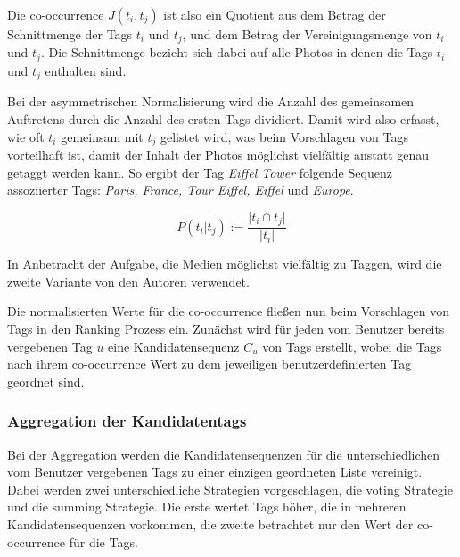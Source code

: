 Die co-occurrence $J(t_i, t_j)$ ist also ein Quotient aus dem Betrag der Schnittmenge der Tags ${t_i}$ und ${t_j}$, und dem Betrag der Vereinigungsmenge von ${t_i}$ und ${t_j}$. Die Schnittmenge bezieht sich dabei auf alle Photos in denen die Tags ${t_i}$ und ${t_j}$ enthalten sind.

Bei der asymmetrischen Normalisierung wird die Anzahl des gemeinsamen Auftretens durch die Anzahl des ersten Tags dividiert. Damit wird also erfasst, wie oft ${t_i}$ gemeinsam mit ${t_j}$ gelistet wird, was beim Vorschlagen von Tags vorteilhaft ist, damit der Inhalt der Photos möglichst vielfältig anstatt genau getaggt werden kann. So ergibt der Tag \emph{Eiffel Tower} folgende Sequenz assoziierter Tags: \emph{Paris, France, Tour Eiffel, Eiffel} und \emph{Europe}.
\begin{figure}[hptb]
 \begin{equation}
 \label{asymmetricNormalization}
  P(t_i \vert t_j) := \frac{\vert t_i \cap t_j \vert}{ \vert t_i \vert }
 \end{equation}
\end{figure}

In Anbetracht der Aufgabe, die Medien möglichst vielfältig zu Taggen, wird die zweite Variante von den Autoren verwendet.

Die normalisierten Werte für die co-occurrence fließen nun beim Vorschlagen von Tags in den Ranking Prozess ein. Zunächst wird für jeden vom Benutzer bereits vergebenen Tag $u$ eine Kandidatensequenz $C_u$ von Tags erstellt, wobei die Tags nach ihrem co-occurrence Wert zu dem jeweiligen benutzerdefinierten Tag geordnet sind.



\subsubsection{Aggregation der Kandidatentags} %
\label{ssub:aggregation}

Bei der Aggregation werden die Kandidatensequenzen für die unterschiedlichen vom Benutzer vergebenen Tags zu einer einzigen geordneten Liste vereinigt. Dabei werden zwei unterschiedliche Strategien vorgeschlagen, die voting Strategie und die summing Strategie. Die erste wertet Tags höher, die in mehreren Kandidatensequenzen vorkommen, die zweite betrachtet nur den Wert der co-occurrence für die Tags. 

